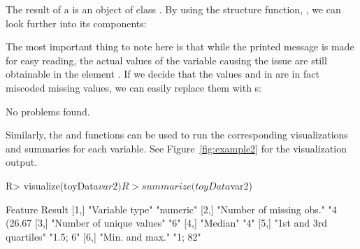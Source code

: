 \documentclass[article,shortnames]{jss}
\begin{document}
The result of a  is an object of class
. By using the structure function, , we can
look further into its components:

\begin{Schunk}
\end{Schunk}

The most important thing to note here is that while the printed
message is made for easy reading, the actual values of the variable
causing the issue are still obtainable in the element
. If we decide that the values 
and  in  are in fact miscoded missing values, we can
easily replace them with s:

\begin{Schunk}
\begin{Soutput}
No problems found.
\end{Soutput}
\end{Schunk}

Similarly, the  and  functions can be
used to run the corresponding visualizations and summaries for each
variable. See Figure~\ref{fig:example2} for the visualization output.

\begin{Schunk}
\begin{Sinput}
R> visualize(toyData$var2)
R> summarize(toyData$var2)
\end{Sinput}
\begin{Soutput}
     Feature                   Result       
[1,] "Variable type"           "numeric"    
[2,] "Number of missing obs."  "4 (26.67 %
[3,] "Number of unique values" "6"          
[4,] "Median"                  "4"          
[5,] "1st and 3rd quartiles"   "1.5; 6"     
[6,] "Min. and max."           "1; 82"      
\end{Soutput}
\end{Schunk}
\end{document}
